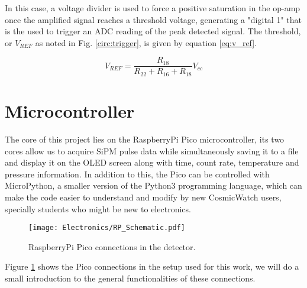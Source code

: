 In this case, a voltage divider is used to force a positive saturation in the op-amp once the amplified signal reaches a threshold voltage, generating a "digital 1"\: that is the used to trigger an ADC reading of the peak detected signal. The threshold, or $V_{REF}$ as noted in Fig. \ref{circ:trigger}, is given by equation \eqref{eq:v_ref}.

\begin{equation}
    V_{REF}=\frac{R_{18}}{R_{22}+R_{16}+R_{18}} V_{cc} \label{eq:v_ref}
\end{equation}

\section{Microcontroller}

The core of this project lies on the RaspberryPi Pico microcontroller, its two cores allow us to acquire SiPM pulse data while simultaneously saving it to a file and display it on the OLED screen along with time, count rate, temperature and pressure information. In addition to this, the Pico can be controlled with MicroPython, a smaller version of the Python3 programming language, which can make the code easier to understand and modify by new CosmicWatch users, specially students who might be new to electronics.

\begin{figure}
    \centering
    \texttt{[image: Electronics/RP\_Schematic.pdf]}
    \caption{RaspberryPi Pico connections in the detector.}
    \label{fig:RP_schematic}
\end{figure}

Figure \ref{fig:RP_schematic} shows the Pico connections in the setup used for this work, we will do a small introduction to the general functionalities of these connections.

